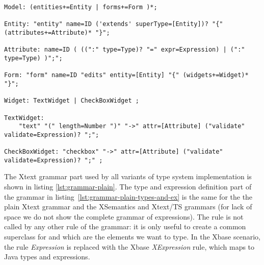 % 

%

\begin{lstlisting}[language=xtext,float,label=lst:grammar-plain,caption=Grammar
with plain Xtext.] 
Model: (entities+=Entity | forms+=Form )*;

Entity: "entity" name=ID ('extends' superType=[Entity])? "{" (attributes+=Attribute)* "}";

Attribute: name=ID ( ((":" type=Type)? "=" expr=Expression) | (":" type=Type) )";";

Form: "form" name=ID "edits" entity=[Entity] "{" (widgets+=Widget)* "}";

Widget: TextWidget | CheckBoxWidget ;

TextWidget:
	"text" "(" length=Number ")" "->" attr=[Attribute] ("validate" validate=Expression)? ";";

CheckBoxWidget: "checkbox" "->" attr=[Attribute] ("validate" validate=Expression)? ";" ;
\end{lstlisting}

The Xtext grammar part used by all variants of type system implementation is
shown in listing \ref{lst:grammar-plain}. The type and expression definition part of the grammar
in listing~\ref{lst:grammar-plain-types-and-ex} is the same for the the plain
Xtext grammar and the XSemantics and Xtext/TS grammars (for lack of space we
do not show the complete grammar of expressions).
The rule  is not called by any other rule of the grammar: it is
only useful to create a common superclass for  and
 which are the elements we want to type.
In the Xbase scenario, the rule \emph{Expression} is replaced with the Xbase
\emph{XExpression} rule, which maps to Java types and expressions.

